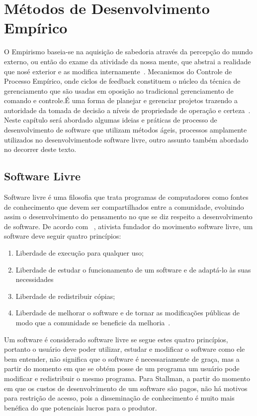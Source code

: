 
\chapter{Métodos de Desenvolvimento Empírico}
\label{cap:desenvolvimento-empirico}

O Empirismo baseia-se na aquisição de sabedoria através da percepção do mundo 
externo, ou então do exame da atividade da nossa mente, que abstrai a realidade 
que nosé exterior e as modifica internamente~\cite{chaui2003}.
%
Mecanismos do Controle de Processo Empírico, onde ciclos de feedback constituem o
núcleo da técnica de gerenciamento que são usadas em oposição ao tradicional 
gerenciamento de comando e controle.É uma forma de planejar e gerenciar projetos 
trazendo a autoridade da tomada de decisão a níveis de propriedade de operação e 
certeza~\cite{Schwaber2004}.
%
Neste capítulo será abordado algumas ideias e práticas de processo de desenvolvimento
de software que utilizam métodos ágeis, processos amplamente utilizados no 
desenvolvimentode software livre, outro assunto também abordado no decorrer 
deste texto.
%
\section{Software Livre}

Software livre é uma filosofia que trata programas de computadores como fontes de 
conhecimento que devem ser compartilhados entre a comunidade, evoluindo assim o 
desenvolvimento do pensamento no que se diz respeito a desenvolvimento de software.
%
De acordo com ~, ativista fundador do movimento software livre, 
um software deve seguir quatro princípios:
%
\begin{enumerate}
\item Liberdade de execução para qualquer uso;
\item Liberdade de estudar o funcionamento de um software e de adaptá-lo às suas 
necessidades
\item Liberdade de redistribuir cópias;
\item Liberdade de melhorar o software e de tornar as modificações públicas de modo 
que a comunidade se beneficie da melhoria~\cite{stallman2001}.
\end{enumerate}
%
Um software é considerado software livre se segue estes quatro princípios, portanto 
o usuário deve poder utilizar, estudar e modificar o software como ele bem entender, 
não significa que o software é necessariamente de graça, mas a partir do momento em 
que se obtém posse de um programa um usuário pode modificar e redistribuir o mesmo 
programa.
%
Para Stallman, a partir do momento em que os custos de desenvolvimento de um software 
são pagos, não há motivos para restrição de acesso, pois a disseminação de conhecimento 
é muito mais benéfica do que potenciais lucros para o produtor.
%

